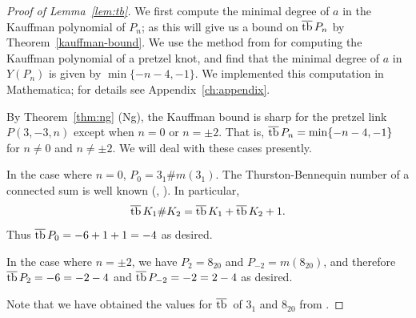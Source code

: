 \begin{proof}[Proof of Lemma~\ref{lem:tb}]

    We first compute the minimal degree of $a$ in the Kauffman polynomial of $P_n$; as this will give us a bound on $\overline{\operatorname{tb}}\, P_n$ by Theorem~\ref{kauffman-bound}. We use the method from \cite{lu-zhong} for computing the Kauffman polynomial of a pretzel knot, and find that the minimal degree of $a$ in $Y(P_n)$ is given by $\min\{-n-4, -1\}$. We implemented this computation in Mathematica; for details see Appendix~\ref{ch:appendix}.
    
    By Theorem~\ref{thm:ng} (Ng), the Kauffman bound is sharp for the pretzel link $P(3, -3, n)$ except when $n = 0$ or $n = \pm 2$. That is, ${\overline{\operatorname{tb}}\, P_n = \min\{-n-4, -1\}}$ for $n \neq 0$ and $n \neq \pm 2$. We will deal with these cases presently.

    In the case where $n = 0$, ${P_0 = 3_1 \# m(3_1)}$. The Thurston-Bennequin number of a connected sum is well known (\cite{torisu}, \cite{honda}). In particular,
    \[
        \overline{\operatorname{tb}}\,{K_1 \# K_2} = \overline{\operatorname{tb}}\, K_1 + \overline{\operatorname{tb}}\, K_2 + 1.
    \]
    Thus $\overline{\operatorname{tb}}\, P_0 = -6 + 1 + 1 = -4$ as desired.

    In the case where $n = \pm 2$, we have $P_2 = 8_{20}$ and $P_{-2} = m(8_{20})$, and therefore ${\overline{\operatorname{tb}}\, P_2 = -6 = -2-4}$ and ${\overline{\operatorname{tb}}\, P_{-2} = -2 = 2-4}$ as desired.

    Note that we have obtained the values for $\overline{\operatorname{tb}}\,$ of $3_1$ and $8_{20}$ from \cite{atlas}.

\end{proof}


